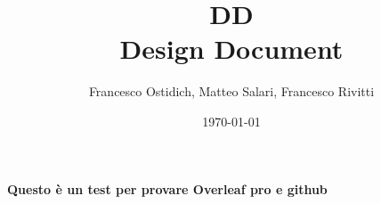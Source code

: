
\title{\Huge DD \\[4mm] \Large Design Document \\[4mm]}
\author{Francesco Ostidich, Matteo Salari, Francesco Rivitti}
\date{\today}
\maketitle
\vspace{12mm}
\textbf{Questo è un test per provare Overleaf pro e github}
\tableofcontents
\newpage

